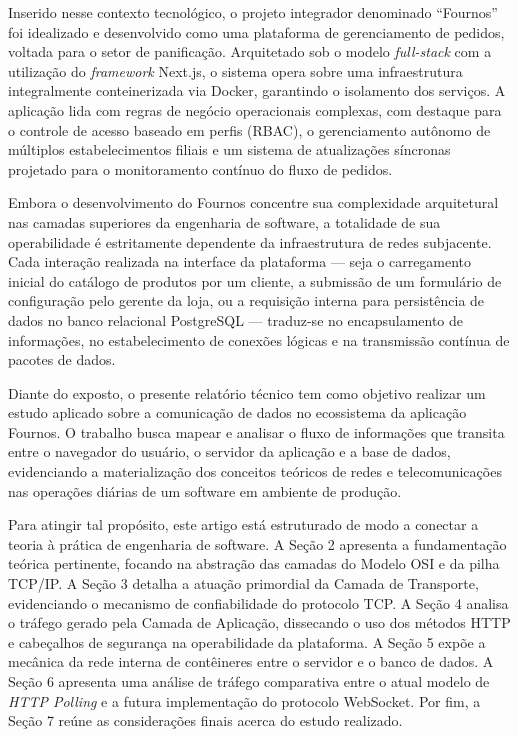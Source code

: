 \documentclass[12pt, a4paper]{article}
\begin{document}
Inserido nesse contexto tecnológico, o projeto integrador denominado ``Fournos'' foi idealizado e desenvolvido como uma plataforma de gerenciamento de pedidos, voltada para o setor de panificação. Arquitetado sob o modelo \textit{full-stack} com a utilização do \textit{framework} Next.js, o sistema opera sobre uma infraestrutura integralmente conteinerizada via Docker, garantindo o isolamento dos serviços. A aplicação lida com regras de negócio operacionais complexas, com destaque para o controle de acesso baseado em perfis (RBAC), o gerenciamento autônomo de múltiplos estabelecimentos filiais e um sistema de atualizações síncronas projetado para o monitoramento contínuo do fluxo de pedidos.

Embora o desenvolvimento do Fournos concentre sua complexidade arquitetural nas camadas superiores da engenharia de software, a totalidade de sua operabilidade é estritamente dependente da infraestrutura de redes subjacente. Cada interação realizada na interface da plataforma --- seja o carregamento inicial do catálogo de produtos por um cliente, a submissão de um formulário de configuração pelo gerente da loja, ou a requisição interna para persistência de dados no banco relacional PostgreSQL --- traduz-se no encapsulamento de informações, no estabelecimento de conexões lógicas e na transmissão contínua de pacotes de dados.

Diante do exposto, o presente relatório técnico tem como objetivo realizar um estudo aplicado sobre a comunicação de dados no ecossistema da aplicação Fournos. O trabalho busca mapear e analisar o fluxo de informações que transita entre o navegador do usuário, o servidor da aplicação e a base de dados, evidenciando a materialização dos conceitos teóricos de redes e telecomunicações nas operações diárias de um software em ambiente de produção.

Para atingir tal propósito, este artigo está estruturado de modo a conectar a teoria à prática de engenharia de software. A Seção 2 apresenta a fundamentação teórica pertinente, focando na abstração das camadas do Modelo OSI e da pilha TCP/IP. A Seção 3 detalha a atuação primordial da Camada de Transporte, evidenciando o mecanismo de confiabilidade do protocolo TCP. A Seção 4 analisa o tráfego gerado pela Camada de Aplicação, dissecando o uso dos métodos HTTP e cabeçalhos de segurança na operabilidade da plataforma. A Seção 5 expõe a mecânica da rede interna de contêineres entre o servidor e o banco de dados. A Seção 6 apresenta uma análise de tráfego comparativa entre o atual modelo de \textit{HTTP Polling} e a futura implementação do protocolo WebSocket. Por fim, a Seção 7 reúne as considerações finais acerca do estudo realizado.
\end{document}
